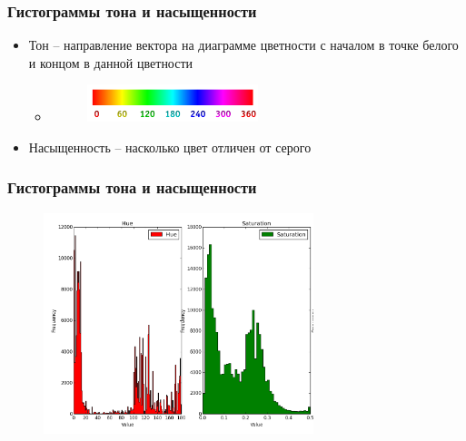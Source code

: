 \documentclass[xetex,mathserif,serif]{beamer}
\begin{document}
\begin{frame}
	\frametitle{Гистограммы тона и насыщенности}

	\begin{itemize}
		\item Тон -- направление вектора на диаграмме цветности с началом в точке белого и концом в данной цветности
		      \begin{itemize}
			      \item \begin{figure}[h]
				            \includegraphics[width=0.5\textwidth]{./images/hue.png}
				            \centering
			            \end{figure}
		      \end{itemize}
		\item Насыщенность -- насколько цвет отличен от серого
	\end{itemize}
\end{frame}





\begin{frame}
	\frametitle{Гистограммы тона и насыщенности}

	\begin{figure}[h]
		\includegraphics[width=0.7\textwidth]{./images/hue_saturation.png}
		\centering
	\end{figure}


\end{frame}
\end{document}
